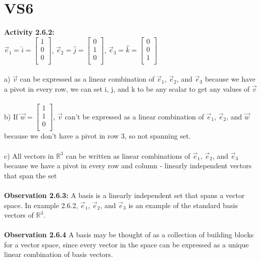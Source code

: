 \documentclass{article}
\begin{document}
{\section{VS6}
\textbf{Activity 2.6.2:}\\
$\vec{e}_{1} = \hat{i} = \begin{bmatrix} 
1\\ 
0\\
0\\
\end{bmatrix}$, $\vec{e}_{2} = \hat{j} =\begin{bmatrix} 
0\\ 
1\\
0\\
\end{bmatrix}$, $\vec{e}_{3} = \hat{k} =\begin{bmatrix} 
0\\ 
0\\
1\\
\end{bmatrix}$\\
\\
a) $\vec{v}$ can be expressed as a linear combination of $\vec{e}_{1}$, $\vec{e}_{2}$, and $\vec{e}_{3}$ because we have a pivot in every row, we can set i, j, and k to be any scalar to get any values of $\vec{v}$ \\
\\
b) If $\vec{w} = \begin{bmatrix} 
1\\ 
1\\
0\\
\end{bmatrix}$, $\vec{v}$ can't be expressed as a linear combination of $\vec{e}_{1}$, $\vec{e}_{2}$, and $\vec{w}$ because we don't have a pivot in row 3, so not spanning set. \\
\\
c) All vectors in $\mathbb{R}^{3}$ can be written as linear combinations of $\vec{e}_{1}$, $\vec{e}_{2}$, and $\vec{e}_{3}$  because we have a pivot in every row and column - linearly independent vectors that span the set\\
\\
\textbf{Observation 2.6.3:} A basis is a linearly independent set that spans a vector space. In example 2.6.2, $\vec{e}_{1}$, $\vec{e}_{2}$, and $\vec{e}_{3}$ is an example of the standard basis vectors of $\mathbb{R}^{3}$.\\
\\
\textbf{Observation 2.6.4} A basis may be thought of as a collection of building blocks for a vector space, since every vector in the space can be expressed as a unique linear combination of basis vectors.\\
}
\end{document}
